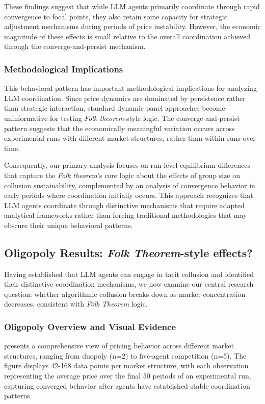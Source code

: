 These findings suggest that while LLM agents primarily coordinate through rapid convergence to focal points, they also retain some capacity for strategic adjustment mechanisms during periods of price instability. However, the economic magnitude of these effects is small relative to the overall coordination achieved through the converge-and-persist mechanism.

\subsubsection*{Methodological Implications}

This behavioral pattern has important methodological implications for analyzing LLM coordination. Since price dynamics are dominated by persistence rather than strategic interaction, standard dynamic panel approaches become uninformative for testing \emph{Folk theorem}-style logic. The converge-and-persist pattern suggests that the economically meaningful variation occurs across experimental runs with different market structures, rather than within runs over time.

Consequently, our primary analysis focuses on run-level equilibrium differences that capture the \emph{Folk theorem}'s core logic about the effects of group size on collusion sustainability, complemented by an analysis of convergence behavior in early periods where coordination initially occurs. This approach recognizes that LLM agents coordinate through distinctive mechanisms that require adapted analytical frameworks rather than forcing traditional methodologies that may obscure their unique behavioral patterns.

\subsection{Oligopoly Results: \emph{Folk Theorem}-style effects?}

Having established that LLM agents can engage in tacit collusion and identified their distinctive coordination mechanisms, we now examine our central research question: whether algorithmic collusion breaks down as market concentration decreases, consistent with \emph{Folk Theorem} logic.

\subsubsection*{Oligopoly Overview and Visual Evidence}

 presents a comprehensive view of pricing behavior across different market structures, ranging from duopoly (n=2) to five-agent competition (n=5). The figure displays 42-168 data points per market structure, with each observation representing the average price over the final 50 periods of an experimental run, capturing converged behavior after agents have established stable coordination patterns.

